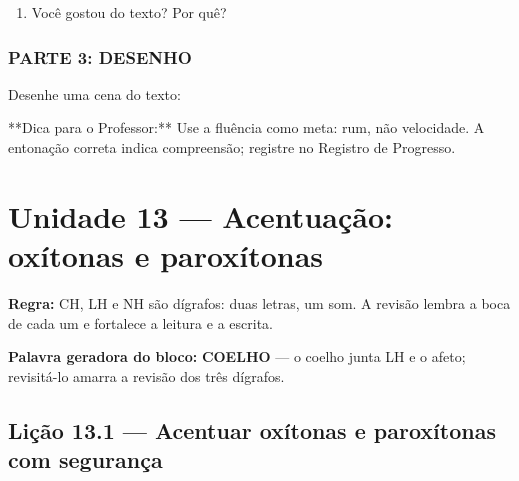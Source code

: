 \begin{exercicio}
\begin{enumerate}
  \item Você gostou do texto? Por quê?
  \begin{center}
  \underline{\hspace{12cm}}
  \end{center}

\end{enumerate}

\subsection*{PARTE 3: DESENHO}

Desenhe uma cena do texto:

\begin{center}
\end{center}

\end{exercicio}

\begin{dica}
**Dica para o Professor:** Use a fluência como meta: rum, não velocidade. A entonação correta indica compreensão; registre no Registro de Progresso.
\end{dica}


\chapter{Unidade 13 --- Acentuação: oxítonas e paroxítonas}


\textbf{Regra:} CH, LH e NH são dígrafos: duas letras, um som. A revisão lembra a boca de cada um e fortalece a leitura e a escrita.

\textbf{Palavra geradora do bloco:} \textbf{COELHO} --- o coelho junta LH e o afeto; revisitá-lo amarra a revisão dos três dígrafos.

\section{Lição 13.1 --- Acentuar oxítonas e paroxítonas com segurança}

